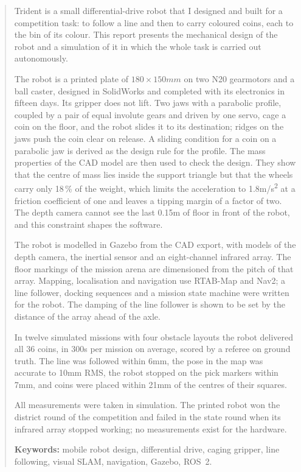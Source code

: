 \begin{quote}
\small
Trident is a small differential-drive robot that I designed and built for a competition
task: to follow a line and then to carry coloured coins, each to the bin of its colour. This
report presents the mechanical design of the robot and a simulation of it in which the
whole task is carried out autonomously.

The robot is a printed plate of $180\times150\unit{mm}$ on two N20 gearmotors and a ball
caster, designed in SolidWorks and completed with its electronics in fifteen days. Its
gripper does not lift. Two jaws with a parabolic profile, coupled by a pair of equal
involute gears and driven by one servo, cage a coin on the floor, and the robot slides it to
its destination; ridges on the jaws push the coin clear on release. A sliding condition for
a coin on a parabolic jaw is derived as the design rule for the profile. The mass properties
of the CAD model are then used to check the design. They show that the centre of mass lies
inside the support triangle but that the wheels carry only 18\,\% of the weight, which
limits the acceleration to 1.8\unit{m/s^2} at a friction coefficient of one and leaves a
tipping margin of a factor of two. The depth camera cannot see the last 0.15\unit{m} of
floor in front of the robot, and this constraint shapes the software.

The robot is modelled in Gazebo from the CAD export, with models of the depth camera, the
inertial sensor and an eight-channel infrared array. The floor markings of the mission
arena are dimensioned from the pitch of that array. Mapping, localisation and navigation
use RTAB-Map and Nav2; a line follower, docking sequences and a mission state machine were
written for the robot. The damping of the line follower is shown to be set by the distance
of the array ahead of the axle.

In twelve simulated missions with four obstacle layouts the robot delivered all 36 coins,
in 300\unit{s} per mission on average, scored by a referee on ground truth. The line was
followed within 6\unit{mm}, the pose in the map was accurate to 10\unit{mm} RMS, the robot
stopped on the pick markers within 7\unit{mm}, and coins were placed within 21\unit{mm} of
the centres of their squares.

All measurements were taken in simulation. The printed robot won the district round of the
competition and failed in the state round when its infrared array stopped working; no
measurements exist for the hardware.

\medskip
\noindent\textbf{Keywords:} mobile robot design, differential drive, caging gripper, line
following, visual SLAM, navigation, Gazebo, ROS~2.
\end{quote}
